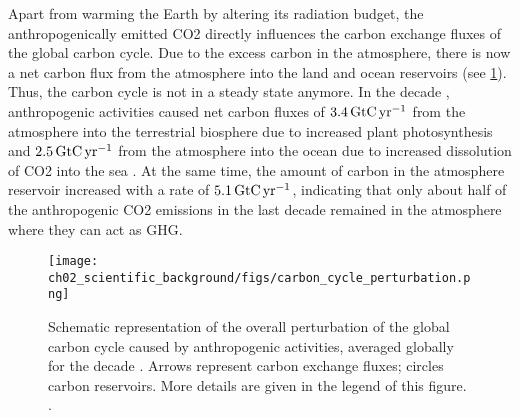 Apart from warming the Earth by altering its radiation budget, the
anthropogenically emitted \ac{CO2} directly influences the carbon exchange
fluxes of the global carbon cycle. Due to the excess carbon in the atmosphere,
there is now a net carbon flux from the atmosphere into the land and ocean
reservoirs (see \cref{fig:02:carbon_cycle_perturbation}). Thus, the carbon
cycle is not in a steady state anymore. In the decade ,
anthropogenic activities caused net carbon fluxes of $3.4 \unit{\GtCyr{}}$ from
the atmosphere into the terrestrial biosphere due to increased plant
photosynthesis and $2.5 \unit{\GtCyr{}}$ from the atmosphere into the ocean due
to increased dissolution of \ac{CO2} into the sea
\autocite{Friedlingstein2020}. At the same time, the amount of carbon in the
atmosphere reservoir increased with a rate of $5.1 \unit{\GtCyr{}}$, indicating
that only about half of the anthropogenic \ac{CO2} emissions in the last decade
remained in the atmosphere \autocite{Friedlingstein2020} where they can act as
\ac{GHG}.

\begin{figure}[t]
  \centering
  \texttt{[image: 
    ch02\_scientific\_background/figs/carbon\_cycle\_perturbation.png]}
  \caption[
    Schematic representation of the overall perturbation of the global carbon
    cycle caused by anthropogenic activities.
  ]{
    Schematic representation of the overall perturbation of the global carbon
    cycle caused by anthropogenic activities, averaged globally for the decade
    . Arrows represent carbon exchange fluxes; circles carbon
    reservoirs. More details are given in the legend of this figure.
    .
  }
  \label{fig:02:carbon_cycle_perturbation}
\end{figure}

